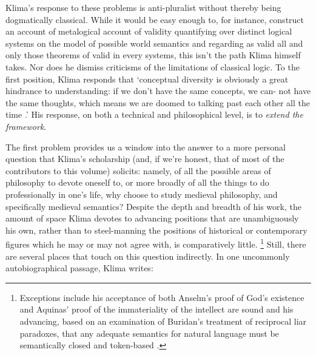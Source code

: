 \documentclass[]{article}
\begin{document}
Klima's response to these problems is anti-pluralist 
without thereby being dogmatically classical. 
While it would be easy enough to, for instance, 
construct an account of metalogical account of validity quantifying over distinct logical systems on the model of possible world semantics and regarding as valid all and only those theorems of valid in every systems, 
this isn't the path Klima himself takes. 
Nor does he dismiss criticisms of the limitations of classical logic. 
To the first position, Klima responds that 
`conceptual diversity is obviously
a great hindrance to understanding: if we don’t have the same concepts, we can-
not have the same thoughts, which means we are doomed to talking past each
other all the time \autocite[36]{Klima2021}.'
His response, on both a technical and philosophical level, 
is to \emph{extend the framework}.

The first problem provides us a window into the answer to a more personal question that Klima's scholarship 
(and, if we're honest, that of most of the contributors to this volume) solicits: 
namely, of all the possible areas of philosophy to devote oneself to, 
or more broadly of all the things to do professionally in one's life, 
why choose to study medieval philosophy, 
and specifically medieval semantics?
Despite the depth and breadth of his work, 
the amount of space Klima devotes to advancing positions that are unambiguously his own, 
rather than to steel-manning the positions of historical or contemporary figures 
which he may or may not agree with,
is comparatively little.
\footnote{Exceptions include his acceptance of both Anselm's proof of God's existence and Aquinas' proof of the immateriality of the intellect are sound \autocite{Klima2000,Klima2009a} 
	and his advancing, 
	based on an examination of Buridan's treatment of reciprocal liar paradoxes, 
	that any adequate semantics for natural language must be semantically closed and token-based \autocite{Klima2004}.} 
Still, there are several places that touch on this question indirectly. 
In one uncommonly autobiographical passage, Klima writes: 
\end{document}
